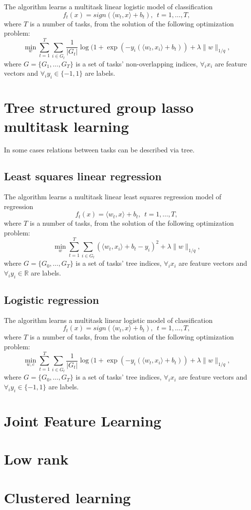 The algorithm learns a multitask linear logistic model of classification 
$$
f_t(x) = sign (\langle w_t,x \rangle + b_t), ~~ t = 1, \dots, T,
$$
where $T$ is a number of tasks, from the solution of the following optimization problem:
$$
\min_w \sum_{t=1}^{T} \sum_{i \in G_t} \frac{1}{|G_t|} \log (1+\exp\left(-y_i(\langle w_t,x_i \rangle + b_t)\right)
+ \lambda \| w \|_{1/q},
$$
where $G = \{ G_1, \dots, G_T \}$ is a set of tasks' non-overlapping indices, $\forall_i x_i$ are feature 
vectors and $\forall_i y_i \in \{-1,1\}$ are labels.

\section{Tree structured group lasso multitask learning}

In some cases relations between tasks can be described via tree. 

\subsection{Least squares linear regression}

The algorithm learns a multitask linear least squares regression model of regression 
$$
f_t(x) = \langle w_t,x \rangle + b_t, ~~ t = 1, \dots, T,
$$
where $T$ is a number of tasks, from the solution of the following optimization problem:
$$
\min_w \sum_{t=1}^{T} \sum_{i \in G_t} \left(\langle w_t,x_i \rangle + b_t - y_i\right)^2
+ \lambda \| w \|_{1/q},
$$
where $G = \{ G_0, \dots, G_T \}$ is a set of tasks' tree indices, $\forall_i x_i$ are feature 
vectors and $\forall_i y_i \in \mathbb{R}$ are labels.

\subsection{Logistic regression}

The algorithm learns a multitask linear logistic model of classification 
$$
f_t(x) = sign (\langle w_t,x \rangle + b_t), ~~ t = 1, \dots, T,
$$
where $T$ is a number of tasks, from the solution of the following optimization problem:
$$
\min_{w,c} \sum_{t=1}^{T} \sum_{i \in G_t} \frac{1}{|G_t|} \log (1+\exp\left(-y_i(\langle w_t,x_i \rangle + b_t)\right)
+ \lambda \| w \|_{1/q},
$$
where $G = \{ G_0, \dots, G_T \}$ is a set of tasks' tree indices, $\forall_i x_i$ are feature 
vectors and $\forall_i y_i \in \{-1,1\}$ are labels.

\section{Joint Feature Learning}

\section{Low rank}

\section{Clustered learning}
